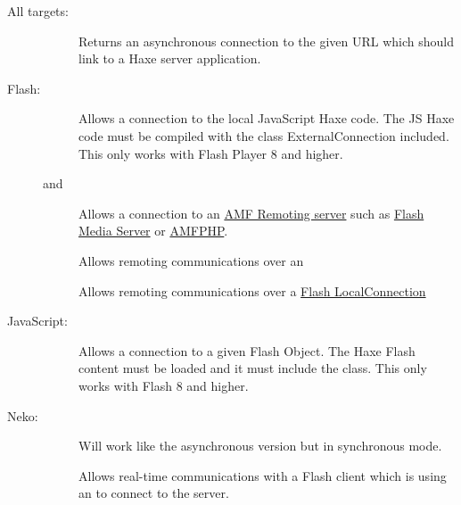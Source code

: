 \begin{description}
	\item[All targets:]
		\begin{description}
			\item[]  
				Returns an asynchronous connection to the given URL which should link to a Haxe server application. 
		\end{description}
		
	\item[Flash:]
		\begin{description}
			\item[]  
				Allows a connection to the local JavaScript Haxe code. The JS Haxe code must be compiled with the class ExternalConnection included. This only works with Flash Player 8 and higher.
			\item[ and ]  
				Allows a connection to an \href{http://en.wikipedia.org/wiki/Action_Message_Format}{AMF Remoting server} such as \href{http://www.adobe.com/products/adobe-media-server-family.html}{Flash Media Server} or \href{http://www.silexlabs.org/amfphp/}{AMFPHP}.
			\item[]  
				Allows remoting communications over an 
			\item[]  
				Allows remoting communications over a \href{https://api.haxe.org/haxe/remoting/LocalConnection.html}{Flash LocalConnection}
		\end{description}
		
	\item[JavaScript:]
		\begin{description}
			\item[]  
				Allows a connection to a given Flash Object. The Haxe Flash content must be loaded and it must include the  class. This only works with Flash 8 and higher. 
		\end{description}
		
	\item[Neko:]
		\begin{description}
			\item[]  
				Will work like the asynchronous version but in synchronous mode.
			\item[]  
				Allows real-time communications with a Flash client which is using an  to connect to the server.
		\end{description}
\end{description}

